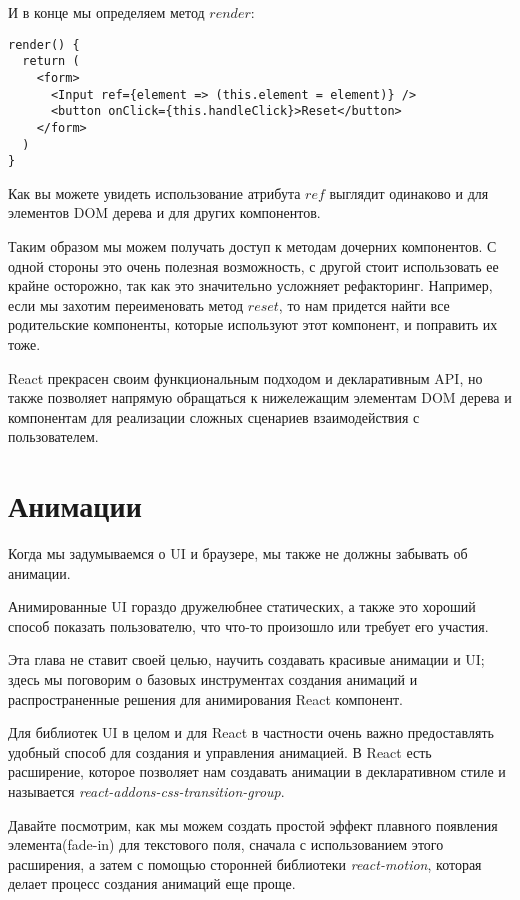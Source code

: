 И в конце мы определяем метод $render$:

\begin{lstlisting}
render() {
  return (
    <form>
      <Input ref={element => (this.element = element)} />
      <button onClick={this.handleClick}>Reset</button>
    </form>
  )
}
\end{lstlisting}

Как вы можете увидеть использование атрибута $ref$ выглядит одинаково и для элементов DOM дерева и для других компонентов.

Таким образом мы можем получать доступ к методам дочерних компонентов. С одной стороны это очень полезная возможность, с другой стоит использовать ее крайне осторожно, так как это значительно усложняет рефакторинг. Например, если мы захотим переименовать метод $reset$, то нам придется найти все родительские компоненты, которые используют этот компонент, и поправить их тоже.

React прекрасен своим функциональным подходом и декларативным API, но также позволяет напрямую обращаться к нижележащим элементам DOM дерева и компонентам для реализации сложных сценариев взаимодействия с пользователем.

\section{Анимации}

Когда мы задумываемся о UI и браузере, мы также не должны забывать об анимации.

Анимированные UI гораздо дружелюбнее статических, а также это хороший способ показать пользователю, что что-то произошло или требует его участия.

Эта глава не ставит своей целью, научить создавать красивые анимации и UI; здесь мы поговорим о базовых инструментах создания анимаций и распространенные решения для анимирования React компонент. 

Для библиотек UI в целом и для React в частности очень важно предоставлять удобный способ для создания и управления анимацией. В React есть расширение, которое позволяет нам создавать анимации в декларативном стиле и называется \textit{react-addons-css-transition-group}. 

Давайте посмотрим, как мы можем создать простой эффект плавного появления элемента(fade-in) для текстового поля, сначала с использованием этого расширения, а затем с помощью сторонней библиотеки \textit{react-motion}, которая делает процесс создания анимаций еще проще.

